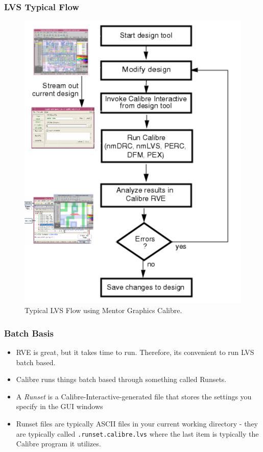 \documentclass{beamer}
\begin{document}
\begin{frame}
\frametitle{LVS Typical Flow}
\begin{center}
\begin{figure}
	\vspace{-0.1in}
\includegraphics[scale=0.125]{Fig/lvs1.png} 
\vspace{-0.1in}
\caption{Typical LVS Flow using Mentor Graphics Calibre.}
\end{figure}
\end{center}
\end{frame}
\begin{frame}[fragile]
\frametitle{Batch Basis}
\begin{itemize}
\item RVE is great, but it takes time to run.  Therefore, its
  convenient to run LVS batch based.
\item Calibre runs things batch based through something called
  Runsets.
\item A \textit{Runset} is a Calibre-Interactive-generated file that stores the
  settings you specify in the GUI windows
\item Runset files are typically ASCII files in your current working
  directory - they are typically called \verb+.runset.calibre.lvs+
  where the last item is typically the Calibre program it utilizes. 
\end{itemize}
\end{frame}
\end{document}
